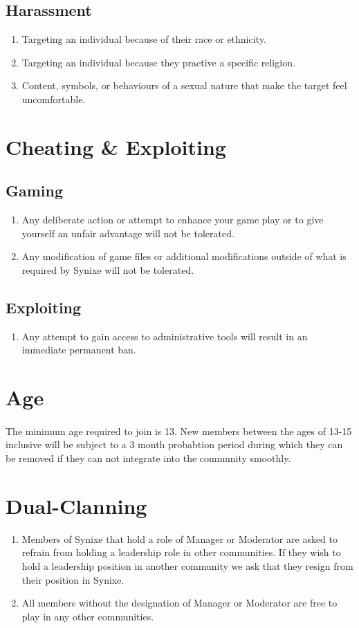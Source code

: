 \documentclass[10pt,a4paper]{article}
\begin{document}
\subsection{Harassment}
\begin{enumerate}
	\item Targeting an individual because of their race or ethnicity.
	\item Targeting an individual because they practive a specific religion.
	\item Content, symbols, or behaviours of a sexual nature that make the target feel uncomfortable.
\end{enumerate}
\section{Cheating \& Exploiting}
\subsection{Gaming}
\begin{enumerate}
	\item Any deliberate action or attempt to enhance your game play or to give yourself an unfair advantage will not be tolerated.
	\item Any modification of game files or additional modifications outside of what is required by Synixe will not be tolerated.
\end{enumerate}
\subsection{Exploiting}
\begin{enumerate}
	\item Any attempt to gain access to administrative tools will result in an immediate permanent ban.
\end{enumerate}
\section{Age}
\paragraph{}
The minimum age required to join is 13. New members between the ages of 13-15 inclusive will be subject to a 3 month probabtion period during which they can be removed if they can not integrate into the community smoothly.
\section{Dual-Clanning}
\begin{enumerate}
	\item Members of Synixe that hold a role of Manager or Moderator are asked to refrain from holding a leadership role in other communities. If they wish to hold a leadership position in another community we ask that they resign from their position in Synixe.
	\item All members without the designation of Manager or Moderator are free to play in any other communities.
\end{enumerate}
\end{document}
